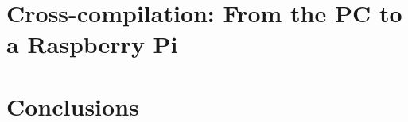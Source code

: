 \documentclass[electronics,article,submit,moreauthors,pdftex,10pt,a4paper]{mdpi}
\theoremstyle{mdpi}
\newcounter{ex}
\newcounter{re}
\theoremstyle{mdpidefinition}
\begin{document}
\section{Cross-compilation: From the PC to a Raspberry Pi}


\section{Conclusions}


\appendix








\end{document}
